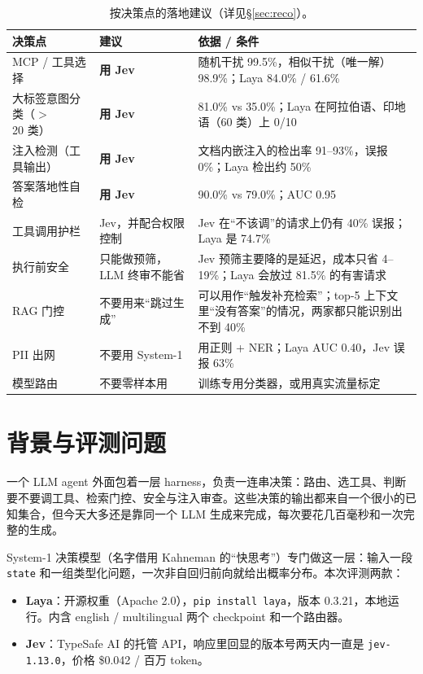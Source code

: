 \documentclass[UTF8,fontset=none,zihao=-4]{ctexart}
\newcommand{\laya}{\textsf{Laya}}
\newcommand{\jev}{\textsf{Jev}}
\begin{document}
\begin{table}[h]
\centering\small
\begin{tabular}{@{}p{3.3cm}p{2.6cm}p{8.6cm}@{}}
\toprule
决策点 & 建议 & 依据 / 条件\\
\midrule
MCP / 工具选择 & \textbf{用 \jev{}} & 随机干扰 99.5\%，相似干扰（唯一解）98.9\%；\laya{} 84.0\% / 61.6\%\\
大标签意图分类（$>$20 类） & \textbf{用 \jev{}} & 81.0\% vs 35.0\%；\laya{} 在阿拉伯语、印地语（60 类）上 0/10\\
注入检测（工具输出） & \textbf{用 \jev{}} & 文档内嵌注入的检出率 91--93\%，误报 0\%；\laya{} 检出约 50\%\\
答案落地性自检 & \textbf{用 \jev{}} & 90.0\% vs 79.0\%；AUC 0.95\\
工具调用护栏 & \jev{}，并配合权限控制 & \jev{} 在“不该调”的请求上仍有 40\% 误报；\laya{} 是 74.7\%\\
执行前安全 & 只能做预筛，LLM 终审不能省 & \jev{} 预筛主要降的是延迟，成本只省 4--19\%；\laya{} 会放过 81.5\% 的有害请求\\
RAG 门控 & 不要用来“跳过生成” & 可以用作“触发补充检索”；top-5 上下文里“没有答案”的情况，两家都只能识别出不到 40\%\\
PII 出网 & 不要用 System-1 & 用正则 + NER；\laya{} AUC 0.40，\jev{} 误报 63\%\\
模型路由 & 不要零样本用 & 训练专用分类器，或用真实流量标定\\
\bottomrule
\end{tabular}
\caption{按决策点的落地建议（详见\S\ref{sec:reco}）。}
\end{table}

\section{背景与评测问题}
一个 LLM agent 外面包着一层 harness，负责一连串决策：路由、选工具、判断要不要调工具、检索门控、安全与注入审查。这些决策的输出都来自一个很小的已知集合，但今天大多还是靠同一个 LLM 生成来完成，每次要花几百毫秒和一次完整的生成。

System-1 决策模型（名字借用 Kahneman 的“快思考”）专门做这一层：输入一段 \texttt{state} 和一组类型化问题，一次非自回归前向就给出概率分布。本次评测两款：
\begin{itemize}
\item \textbf{\laya{}}：开源权重（Apache 2.0），\texttt{pip install laya}，版本 0.3.21，本地运行。内含 english / multilingual 两个 checkpoint 和一个路由器。
\item \textbf{\jev{}}：TypeSafe AI 的托管 API，响应里回显的版本号两天内一直是 \texttt{jev-1.13.0}，价格 \$0.042 / 百万 token。
\end{itemize}
\end{document}
